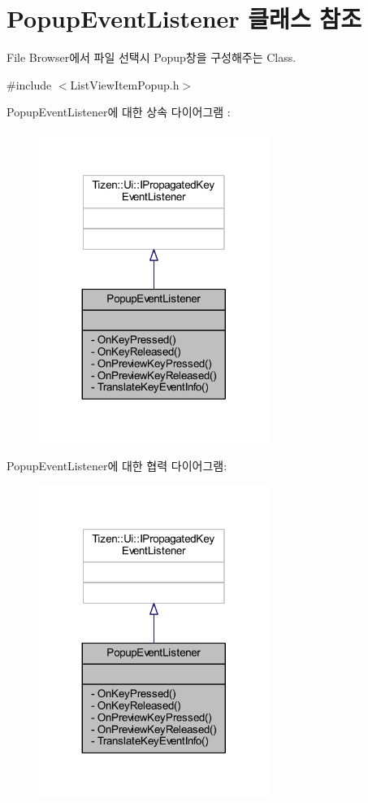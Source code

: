 \hypertarget{class_popup_event_listener}{\section{Popup\+Event\+Listener 클래스 참조}
\label{class_popup_event_listener}
}


File Browser에서 파일 선택시 Popup창을 구성해주는 Class.  




{\ttfamily \#include $<$List\+View\+Item\+Popup.\+h$>$}



Popup\+Event\+Listener에 대한 상속 다이어그램 \+: 
\nopagebreak
\begin{figure}[H]
\begin{center}
\leavevmode
\includegraphics[width=212pt]{class_popup_event_listener__inherit__graph}
\end{center}
\end{figure}


Popup\+Event\+Listener에 대한 협력 다이어그램\+:
\nopagebreak
\begin{figure}[H]
\begin{center}
\leavevmode
\includegraphics[width=212pt]{class_popup_event_listener__coll__graph}
\end{center}
\end{figure}
